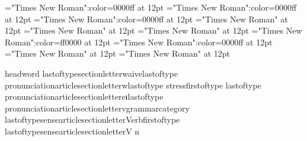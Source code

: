 \font\examplesensearticlesectionletter="Times New Roman":color=0000ff at 12pt
\font\exampleusefirstoftypelastoftypesensearticlesectionletter="Times New Roman":color=0000ff at 12pt
\font\firstoftypegrammarcategorylastoftypesensearticlesectionletter="Times New Roman":color=0000ff at 12pt
\font\firstoftypelastoftypestressfirstoftypelastoftypepronunciationarticlesectionletter="Times New Roman" at 12pt
\font\firstoftypelastoftypepronunciationarticlesectionletter="Times New Roman" at 12pt
\font\firstoftypeheadwordlastoftypesectionletter="Times New Roman" at 12pt
\font\sensebeforearticlesectionletter="Times New Roman":color=ff0000 at 12pt
\font\sensearticlesectionletter="Times New Roman":color=0000ff at 12pt
\font\articlesectionletter="Times New Roman" at 12pt
\font\sectionletter="Times New Roman" at 12pt

\firstoftype headword lastoftypesectionletter{waive}\firstoftype lastoftype pronunciationarticlesectionletter{w}\firstoftype lastoftype stressfirstoftype lastoftype pronunciationarticlesectionletter{eɪ}\firstoftype lastoftype pronunciationarticlesectionletter{v}\firstoftype grammarcategory lastoftypesensearticlesectionletter{Verb}\exampleuse firstoftype lastoftypesensearticlesectionletter{V n}

\bye
